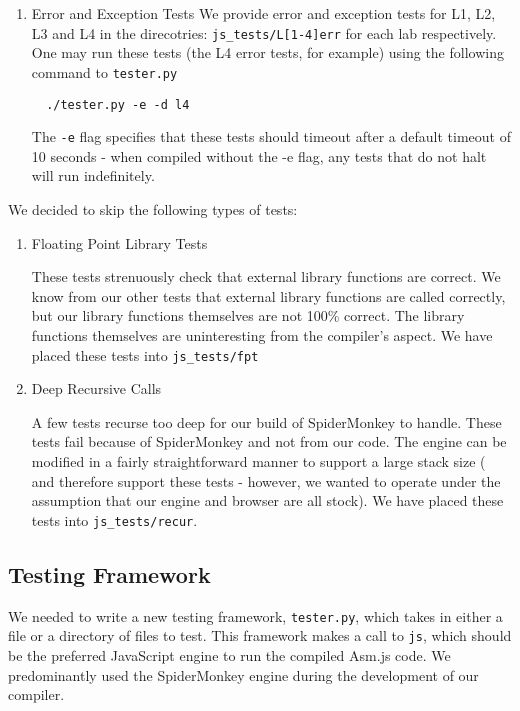 \documentclass[twoside]{article}
\begin{document}
\begin{multicols}{2}
\begin{enumerate}
  \item Error and Exception Tests
  We provide error and exception tests for L1, L2, L3 and L4 in the direcotries:
  \texttt{js\_tests/L[1-4]err} for each lab respectively. One may run these
  tests (the L4 error tests, for example) using the following command to \texttt{tester.py}
\begin{verbatim}
  ./tester.py -e -d l4
\end{verbatim}
  The \texttt{-e} flag specifies that these tests should timeout after a default
  timeout of 10 seconds - when compiled without the -e flag, any tests that do not
  halt will run indefinitely. 

\end{enumerate}

We decided to skip the following types of tests:

\begin{enumerate}

  \item Floating Point Library Tests

    These tests strenuously check that external library functions are correct.
    We know from our other tests that external library functions are called
    correctly, but our library functions themselves are not 100\% correct.
    The library functions themselves are uninteresting from the compiler's
    aspect. We have placed these tests into \texttt{js\_tests/fpt}

  \item Deep Recursive Calls

    A few tests recurse too deep for our build of SpiderMonkey to handle. These
    tests fail because of SpiderMonkey and not from our code. The engine can be 
    modified in a fairly straightforward manner to support a large stack size (
    and therefore support these tests - however, we wanted to operate under the 
    assumption that our engine and browser are all stock). We have placed
    these tests into \texttt{js\_tests/recur}. 

\end{enumerate}

\subsection{Testing Framework}

We needed to write a new testing framework, \texttt{tester.py}, which takes in either a
file or a directory of files to test. This framework makes a call to \texttt{js},
which should be the preferred JavaScript engine to run the compiled Asm.js code.
We predominantly used the SpiderMonkey engine during the development of our
compiler.


\end{multicols}
\end{document}

